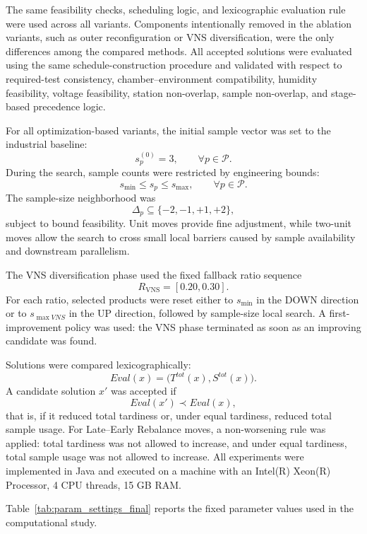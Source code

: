 \documentclass[11pt]{article}
\begin{document}
The same feasibility checks, scheduling logic, and lexicographic evaluation rule were used across all variants. Components intentionally removed in the ablation variants, such as outer reconfiguration or VNS diversification, were the only differences among the compared methods. All accepted solutions were evaluated using the same schedule-construction procedure and validated with respect to required-test consistency, chamber--environment compatibility, humidity feasibility, voltage feasibility, station non-overlap, sample non-overlap, and stage-based precedence logic.


For all optimization-based variants, the initial sample vector was set to the industrial baseline:
\[
s_p^{(0)}=3,\qquad \forall p\in\mathcal{P}.
\]
During the search, sample counts were restricted by engineering bounds:
\[
s_{\min}\le s_p\le s_{\max},\qquad \forall p\in\mathcal{P}.
\]
The sample-size neighborhood was
\[
\Delta_p\subseteq\{-2,-1,+1,+2\},
\]
subject to bound feasibility. Unit moves provide fine adjustment, while two-unit moves allow the search to cross small local barriers caused by sample availability and downstream parallelism.

The VNS diversification phase used the fixed fallback ratio sequence
\[
R_{\mathrm{VNS}}=[0.20,0.30].
\]
For each ratio, selected products were reset either to \(s_{\min}\) in the \textsc{DOWN} direction or to \(s_{\max VNS}\) in the \textsc{UP} direction, followed by sample-size local search. A first-improvement policy was used: the VNS phase terminated as soon as an improving candidate was found.

Solutions were compared lexicographically:
\[
Eval(x)=\big(T^{tot}(x),S^{tot}(x)\big).
\]
A candidate solution \(x'\) was accepted if
\[
Eval(x')\prec Eval(x),
\]
that is, if it reduced total tardiness or, under equal tardiness, reduced total sample usage. For Late--Early Rebalance moves, a non-worsening rule was applied: total tardiness was not allowed to increase, and under equal tardiness, total sample usage was not allowed to increase.
All experiments were implemented in Java and executed on a machine with an Intel(R) Xeon(R) Processor, 4 CPU threads, 15 GB RAM.

Table~\ref{tab:param_settings_final} reports the fixed parameter values used in the computational study.
\end{document}
